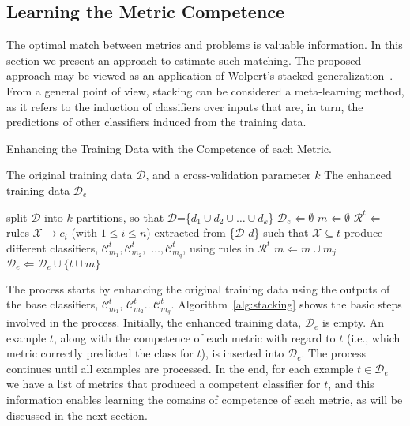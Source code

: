 \subsection{Learning the Metric Competence}

The optimal match between metrics and problems is valuable information. In this section we present an approach to estimate such matching. The proposed approach may be viewed as an application of Wolpert's stacked generalization~\cite{stacking}. From a general point of view, stacking can be considered a meta-learning method, as it refers to the induction of classifiers over inputs that are, in turn, the predictions of other classifiers induced from the training data.

\begin{algorithm} [ht!]
\caption{Enhancing the Training Data with the Competence of each Metric.}
\begin{algorithmic}[1]
\REQUIRE The original training data $\mathcal{D}$, and a cross-validation parameter $k$
\ENSURE The enhanced training data $\mathcal{D}_e$

\medskip

\STATE split $\mathcal{D}$ into $k$ partitions, so that $\mathcal{D}$=\{$d_1\cup d_2\cup\ldots\cup d_k$\}
\STATE $\mathcal{D}_e\Leftarrow\emptyset$
\STATE $m\Leftarrow\emptyset$
\STATE $\mathcal{R}^t\Leftarrow$ rules $\mathcal{X}\xrightarrow{}c_i$ (with $1\le i\le n$) extracted from \{$\mathcal{D}$-$d$\} such that $\mathcal{X}\subseteq t$
\STATE produce different classifiers, $\mathcal{C}^t_{m_1}, \mathcal{C}^t_{m_2},$ $\ldots, \mathcal{C}^t_{m_q}$, using rules in $\mathcal{R}^t$
\STATE $m\Leftarrow m\cup m_j$
\ENDIF
\ENDFOR
\STATE $\mathcal{D}_e\Leftarrow\mathcal{D}_e\cup \{t\cup m\}$
\ENDFOR
\ENDFOR
\end{algorithmic}
\label{alg:stacking}
\end{algorithm}

The process starts by enhancing the original training data using the outputs of the base classifiers, $\mathcal{C}^t_{m_1}$, $\mathcal{C}^t_{m_2}\ldots\mathcal{C}^t_{m_q}$. Algorithm~\ref{alg:stacking} shows the basic steps involved in the process. Initially, the enhanced training data, $\mathcal{D}_e$ is empty. An example $t$, along with the competence of each metric with regard to $t$ (i.e., which metric correctly predicted the class for $t$), is inserted into $\mathcal{D}_e$. The process continues until all examples are processed.
In the end, for each example $t\in\mathcal{D}_e$ we have a list of metrics that produced a competent classifier for $t$, and this information enables learning the comains of competence of each metric, as will be discussed in the next section.


